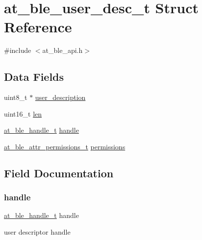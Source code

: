 \hypertarget{structat__ble__user__desc__t}{}\section{at\+\_\+ble\+\_\+user\+\_\+desc\+\_\+t Struct Reference}
\label{structat__ble__user__desc__t}


{\ttfamily \#include $<$at\+\_\+ble\+\_\+api.\+h$>$}

\subsection*{Data Fields}
\begin{DoxyCompactItemize}
\item 
uint8\+\_\+t $\ast$ \mbox{\hyperlink{structat__ble__user__desc__t_a1f32219ae6dcf13bb38efa8631673521}{user\+\_\+description}}
\item 
uint16\+\_\+t \mbox{\hyperlink{structat__ble__user__desc__t_a8aed22e2c7b283705ec82e0120515618}{len}}
\item 
\mbox{\hyperlink{at__ble__api_8h_abd23646d0c662860741f787efc8456f2}{at\+\_\+ble\+\_\+handle\+\_\+t}} \mbox{\hyperlink{structat__ble__user__desc__t_ab8b0f353cb6a8d85f0822900e3b7cf35}{handle}}
\item 
\mbox{\hyperlink{at__ble__api_8h_a5d87cd231ea3f9e11846dba7cf75eb61}{at\+\_\+ble\+\_\+attr\+\_\+permissions\+\_\+t}} \mbox{\hyperlink{structat__ble__user__desc__t_a546cd0fa9c3d1a1d7998330c034e6bc8}{permissions}}
\end{DoxyCompactItemize}


\subsection{Field Documentation}
\mbox{\label{structat__ble__user__desc__t_ab8b0f353cb6a8d85f0822900e3b7cf35}} 
\subsubsection{\texorpdfstring{handle}{handle}}
{\footnotesize\ttfamily \mbox{\hyperlink{at__ble__api_8h_abd23646d0c662860741f787efc8456f2}{at\+\_\+ble\+\_\+handle\+\_\+t}} handle}

user descriptor handle \mbox{\label{structat__ble__user__desc__t_a8aed22e2c7b283705ec82e0120515618}} 
